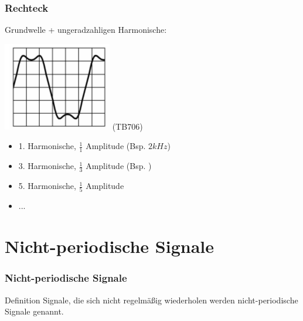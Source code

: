 \begin{frame}
    \frametitle{Rechteck}

    Grundwelle + ungeradzahligen Harmonische:


    \begin{center}
        \includegraphics[width=\textwidth,height=0.5\textheight,keepaspectratio]{a11/TB706.png}
        \tiny (TB706)
    \end{center}

     \begin{itemize}
        \item 1. Harmonische, $\frac{1}{1}$ Amplitude (Bsp. $2kHz$)
        \item 3. Harmonische, $\frac{1}{3}$ Amplitude (Bsp. 
                                                            )
        \item 5. Harmonische, $\frac{1}{5}$ Amplitude
        \item ...
    \end{itemize}
   

\end{frame}

\section{Nicht-periodische Signale}

\begin{frame}
    \frametitle{Nicht-periodische Signale}

	\begin{block}{Definition}
      Signale, die sich nicht regelmäßig wiederholen werden nicht-periodische Signale genannt.
    \end{block}

\end{frame}

